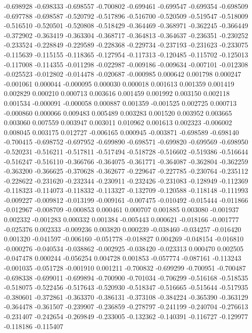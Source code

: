 -0.698928
-0.698333
-0.698557
-0.700802
-0.699461
-0.699547
-0.699354
-0.698509
-0.697788
-0.698587
-0.520792
-0.517896
-0.516700
-0.520509
-0.519547
-0.518009
-0.516510
-0.520501
-0.520808
-0.518429
-0.364469
-0.368971
-0.362245
-0.366449
-0.372902
-0.363419
-0.363304
-0.368717
-0.364813
-0.364637
-0.236351
-0.230252
-0.233524
-0.228849
-0.229589
-0.228368
-0.229734
-0.237193
-0.231623
-0.233075
-0.115639
-0.115155
-0.118365
-0.127954
-0.117313
-0.120485
-0.115702
-0.125013
-0.117008
-0.114355
-0.011298
-0.022987
-0.009186
-0.009634
-0.007101
-0.012308
-0.025523
-0.012802
-0.014478
-0.020687
-0.000985
0.000642
0.001798
0.000247
-0.001061
0.000044
-0.000095
0.000030
0.000018
0.001613
0.001359
0.001419
0.002829
0.000210
0.000713
0.003616
0.001459
0.001992
0.003150
0.002118
0.001534
-0.000091
-0.000058
0.000887
0.001359
-0.001525
0.002725
0.000713
-0.000860
0.000066
0.009483
0.005489
0.003283
0.001520
0.003952
0.003665
0.003060
0.007559
0.003947
0.003011
0.010962
0.001613
0.002323
-0.006002
0.008045
0.003175
0.012727
-0.006165
0.000945
-0.003871
-0.698589
-0.698140
-0.700415
-0.698752
-0.697952
-0.699890
-0.698571
-0.699820
-0.699569
-0.698950
-0.520231
-0.516211
-0.517811
-0.517494
-0.518728
-0.516602
-0.519386
-0.516644
-0.516247
-0.516110
-0.366766
-0.364075
-0.361771
-0.364087
-0.362804
-0.362259
-0.363200
-0.366625
-0.370628
-0.362677
-0.229647
-0.227785
-0.230764
-0.235112
-0.228622
-0.231620
-0.232344
-0.230911
-0.232426
-0.231083
-0.128949
-0.112369
-0.118323
-0.114073
-0.118332
-0.113327
-0.132709
-0.120588
-0.118148
-0.111993
-0.009227
-0.009812
-0.013199
-0.009161
-0.007475
-0.010492
-0.015444
-0.011866
-0.012967
-0.008709
-0.000853
0.000461
0.000707
0.001885
0.003080
-0.001937
0.002332
-0.001283
0.000332
0.001384
-0.005443
0.000621
-0.018166
-0.001777
-0.025376
0.002333
-0.009236
0.003820
0.000239
-0.038460
-0.034257
-0.016420
0.001320
-0.041597
-0.006160
-0.051778
-0.018827
0.004269
-0.048154
-0.016810
-0.000276
-0.040534
-0.038862
-0.002925
-0.038420
-0.023313
0.000470
0.002505
-0.047478
0.000244
-0.056254
0.004728
0.001853
-0.057774
-0.087161
-0.113243
-0.001035
-0.051728
-0.001910
0.001211
-0.700832
-0.699299
-0.700951
-0.700487
-0.698338
-0.699011
-0.699894
-0.700900
-0.701034
-0.706299
-0.516168
-0.518535
-0.518075
-0.522456
-0.517643
-0.520930
-0.518347
-0.516665
-0.515644
-0.517935
-0.380601
-0.372861
-0.363370
-0.386131
-0.373108
-0.384224
-0.365390
-0.363129
-0.364478
-0.361507
-0.239907
-0.236859
-0.278797
-0.241199
-0.240704
-0.276613
-0.231407
-0.242654
-0.269849
-0.233005
-0.132362
-0.140391
-0.116727
-0.129977
-0.118186
-0.115407
